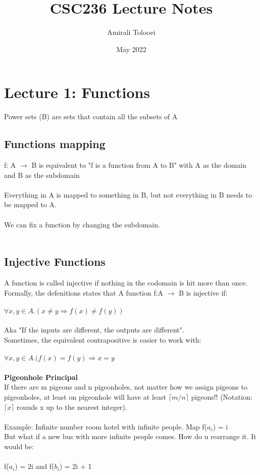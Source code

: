 \documentclass{article}
\title{CSC236 Lecture Notes}
\author{Amirali Tolooei}
\date{May 2022}
\begin{document}
\maketitle

\section{Lecture 1: Functions}

Power sets (B) are sets that contain all the subsets of A

\subsection{Functions mapping}

f: A $\rightarrow$ B is equivalent to "f is a function from A to B"
with A as the domain and B as the subdomain\\ \\
Everything in A is mapped to something in B, but not everything in B needs to be mapped to A. \\ \\
We can fix a function by changing the subdomain. \\ \\

\subsection{Injective Functions} 
A function is called injective if nothing in the codomain is hit more than once. Formally, the defenitions states that A function f:A $\rightarrow$ B is injective if: \\ \\
$\forall x, y \in A. (x \neq y \Rightarrow f(x) \neq f(y))$ \\ \\
Aka "If the inputs are different, the outputs are different".\\
Sometimes, the equivalent contrapositive is easier to work with:\\ \\
$\forall x, y \in A. (f(x) = f(y) \Rightarrow x = y$ \\ \\

\textbf{Pigeonhole Principal} \\
If there are m pigeons and n pigeonholes, not matter how we assign pigeons to pigeonholes, at least on pigeonhole will have at least $\lceil m/n \rceil$ pigeons!! (Notation: $\lceil x \rceil$ rounds x up to the nearest integer). \\ \\
Example: Infinite number room hotel with infinite people. Map f($a_i$) = i\\
But what if a new bus with more infinite people comes. How do u rearrange it. It would be:\\ \\
f($a_i$) = 2i and f($b_i$) = 2i + 1 \\
\end{document}
